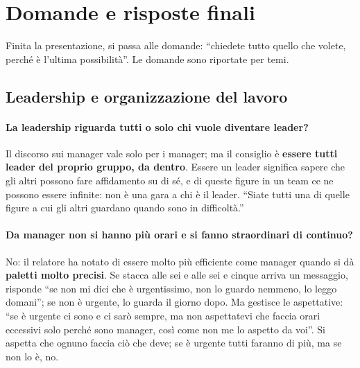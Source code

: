 \section{Domande e risposte finali}
\label{sec:z2-qa-finale}

Finita la presentazione, si passa alle domande: ``chiedete tutto quello che volete, perché è
l'ultima possibilità''. Le domande sono riportate per temi.

\subsection{Leadership e organizzazione del lavoro}

\paragraph{La leadership riguarda tutti o solo chi vuole diventare leader?} Il discorso sui
manager vale solo per i manager; ma il consiglio è \textbf{essere tutti leader del proprio gruppo,
da dentro}. Essere un leader significa sapere che gli altri possono fare affidamento su di sé, e
di queste figure in un team ce ne possono essere infinite: non è una gara a chi è il leader.
``Siate tutti una di quelle figure a cui gli altri guardano quando sono in difficoltà.''

\paragraph{Da manager non si hanno più orari e si fanno straordinari di continuo?} No: il relatore
ha notato di essere molto più efficiente come manager quando si dà \textbf{paletti molto precisi}.
Se stacca alle sei e alle sei e cinque arriva un messaggio, risponde ``se non mi dici che è
urgentissimo, non lo guardo nemmeno, lo leggo domani''; se non è urgente, lo guarda il giorno dopo.
Ma gestisce le aspettative: ``se è urgente ci sono e ci sarò sempre, ma non aspettatevi che faccia
orari eccessivi solo perché sono manager, così come non me lo aspetto da voi''. Si aspetta che
ognuno faccia ciò che deve; se è urgente tutti faranno di più, ma se non lo è, no.

